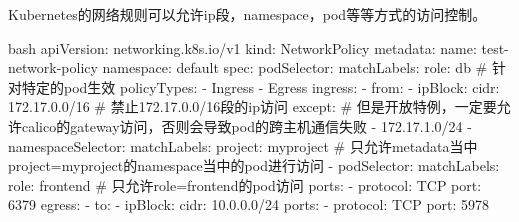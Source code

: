 Kubernetes的网络规则可以允许ip段，namespace，pod等等方式的访问控制。
\begin{code-block}{bash}
apiVersion: networking.k8s.io/v1
kind: NetworkPolicy
metadata:
  name: test-network-policy
  namespace: default
spec:
  podSelector:
    matchLabels:
      role: db                # 针对特定的pod生效
  policyTypes:
  - Ingress
  - Egress
  ingress:
  - from:
    - ipBlock:
        cidr: 172.17.0.0/16   # 禁止172.17.0.0/16段的ip访问
        except:               # 但是开放特例，一定要允许calico的gateway访问，否则会导致pod的跨主机通信失败
        - 172.17.1.0/24
    - namespaceSelector:
        matchLabels:
          project: myproject  # 只允许metadata当中project=myproject的namespace当中的pod进行访问
    - podSelector:
        matchLabels:
          role: frontend      # 只允许role=frontend的pod访问
    ports:
    - protocol: TCP
      port: 6379
  egress:
  - to:
    - ipBlock:
        cidr: 10.0.0.0/24
    ports:
    - protocol: TCP
      port: 5978
\end{code-block}

